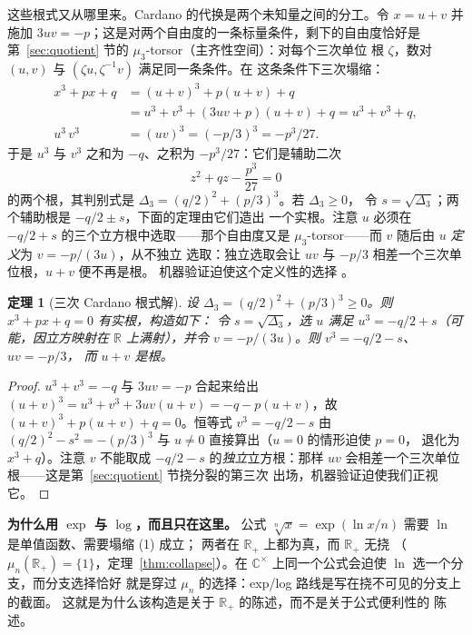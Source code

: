 \documentclass[submission,noinfoline]{jsfds}
\newtheorem{theorem}{定理}
\newcommand{\Lean}[1]{}
\begin{document}
这些根式又从哪里来。Cardano 的代换是两个未知量之间的分工。令 $x=u+v$
并施加 $3uv=-p$；这是对两个自由度的一条标量条件，剩下的自由度恰好是
第~\ref{sec:quotient} 节的 $\mu_3$-torsor（主齐性空间）：对每个三次单位
根 $\zeta$，数对 $(u,v)$ 与 $(\zeta u,\zeta^{-1}v)$ 满足同一条条件。在
这条条件下三次塌缩：
\begin{align*}
  x^3+px+q &=(u+v)^3+p(u+v)+q\\
           &=u^3+v^3+(3uv+p)(u+v)+q
            =u^3+v^3+q ,\\
  u^3\,v^3 &=(uv)^3=(-p/3)^3=-p^3/27 .
\end{align*}
于是 $u^3$ 与 $v^3$ 之和为 $-q$、之积为 $-p^3/27$：它们是辅助二次
\begin{equation*}
  z^2+qz-\frac{p^3}{27}=0
\end{equation*}
的两个根，其判别式是 $\Delta_3=(q/2)^2+(p/3)^3$。若 $\Delta_3\ge0$，
令 $s=\sqrt{\Delta_3}$；两个辅助根是 $-q/2\pm s$，下面的定理由它们造出
一个实根。注意 $u$ 必须在 $-q/2+s$ 的三个立方根中选取——那个自由度又是
$\mu_3$-torsor——而 $v$ 随后由 $u$ \emph{定义}为 $v=-p/(3u)$，从不独立
选取：独立选取会让 $uv$ 与 $-p/3$ 相差一个三次单位根，$u+v$ 便不再是根。
机器验证迫使这个定义性的选择 \Lean{vcube, cardano\_certificate}。

\begin{theorem}[三次 Cardano 根式解]\label{thm:cubic}
设 $\Delta_3=(q/2)^2+(p/3)^3\ge 0$。则 $x^3+px+q=0$ 有实根，构造如下：
令 $s=\sqrt{\Delta_3}$，选 $u$ 满足 $u^3=-q/2+s$（可能，因立方映射在
$\mathbb R$ 上满射），并令 $v=-p/(3u)$。则 $v^3=-q/2-s$、$uv=-p/3$，
而 $u+v$ 是根。
\end{theorem}
\begin{proof}
$u^3+v^3=-q$ 与 $3uv=-p$ 合起来给出
$(u+v)^3=u^3+v^3+3uv(u+v)=-q-p(u+v)$，故
$(u+v)^3+p(u+v)+q=0$。恒等式 $v^3=-q/2-s$ 由
$(q/2)^2-s^2=-(p/3)^3$ 与 $u\ne0$ 直接算出（$u=0$ 的情形迫使 $p=0$，
退化为 $x^3+q$）。注意 $v$ 不能取成 $-q/2-s$ 的\emph{独立}立方根：那样
$uv$ 会相差一个三次单位根——这是第~\ref{sec:quotient} 节挠分裂的第三次
出场，机器验证迫使我们正视它。
\Lean{cube\_surj, vcube, cardano\_certificate, cubic\_solvable}
\end{proof}

\textbf{为什么用 $\exp$ 与 $\log$，而且只在这里。} 公式
$\sqrt[n]{x}=\exp(\ln x/n)$ 需要 $\ln$ 是单值函数、需要塌缩 (1) 成立；
两者在 $\mathbb R_+$ 上都为真，而 $\mathbb R_+$ 无挠
（$\mu_n(\mathbb R_+)=\{1\}$，定理~\ref{thm:collapse}）。在
$\mathbb C^\times$ 上同一个公式会迫使 $\ln$ 选一个分支，而分支选择恰好
就是穿过 $\mu_n$ 的选择：exp/log 路线是写在挠不可见的分支上的截面。
这就是为什么该构造是关于 $\mathbb R_+$ 的陈述，而不是关于公式便利性的
陈述。
\end{document}
